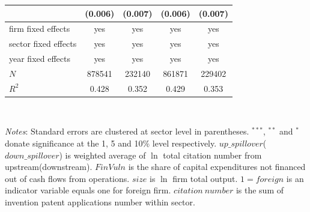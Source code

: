 \documentclass[12pt]{article}%
\begin{document}
\begin{CJK*}{GBK}{fs}
\begin{table}[!h]
{{{\begin{tabular}{l*{4}{c}}
           &    (0.006) &    (0.007) &    (0.006) &    (0.007) \\
           \hline
firm fixed effects      &     yes         &       yes&     yes     &      yes\\
sector fixed effects      &     yes         &       yes&     yes     &      yes\\
year fixed effects      &     yes         &       yes&     yes     &      yes\\
\hline
\(N\)       &     878541 &    232140 &    861871 &    229402 \\
\(R^{2}\)    &0.428 &      0.352 &      0.429 &      0.353 \\
\hline\hline
\end{tabular}
}\\
}
}
\scriptsize {
\par \emph{Notes}: Standard errors are clustered at sector level in parentheses. $^{***}$, $^{**}$ and $^{*}$ donate significance at the 1, 5 and 10\% level respectively. $up\_spillover$($down\_spillover$) is weighted average of $\ln$ total citation number from upstream(downstream). $FinVuln$ is the share of capital expenditures not financed out of cash flows from operations. $size$ is $\ln$ firm total output. $1=foreign$ is an indicator variable equals one for foreign firm. $citation~number$ is the sum of invention patent applications number within sector.}
\end{table}
\clearpage


\def\sym#1{\ifmmode^{#1}\else\(^{#1}\)\fi}
\begin{table}[!h]
\caption{Robustness: Initial firm size \& tfp }
\setlength{\abovecaptionskip}{0pt}
\setlength{\belowcaptionskip}{0pt}
{\tiny {
}}
\end{table}
\end{CJK*}
\end{document}
